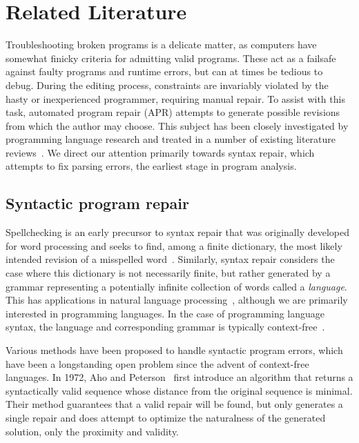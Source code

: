 \chapter{\rm\bfseries Related Literature}
\label{ch:litreview}

Troubleshooting broken programs is a delicate matter, as computers have somewhat finicky criteria for admitting valid programs. These act as a failsafe against faulty programs and runtime errors, but can at times be tedious to debug. During the editing process, constraints are invariably violated by the hasty or inexperienced programmer, requiring manual repair. To assist with this task, automated program repair (APR) attempts to generate possible revisions from which the author may choose. This subject has been closely investigated by programming language research and treated in a number of existing literature reviews~\cite{monperrus2018living, le2021automatic}. We direct our attention primarily towards syntax repair, which attempts to fix parsing errors, the earliest stage in program analysis.

\section{Syntactic program repair}

Spellchecking is an early precursor to syntax repair that was originally developed for word processing and seeks to find, among a finite dictionary, the most likely intended revision of a misspelled word~\cite{kernighan1990spelling}. Similarly, syntax repair considers the case where this dictionary is not necessarily finite, but rather generated by a grammar representing a potentially infinite collection of words called a \textit{language}. This has applications in natural language processing~\cite{bryant2023grammatical}, although we are primarily interested in programming languages. In the case of programming language syntax, the language and corresponding grammar is typically context-free~\cite{chomsky1959algebraic}.

Various methods have been proposed to handle syntactic program errors, which have been a longstanding open problem since the advent of context-free languages. In 1972, Aho and Peterson~\cite{aho1972minimum} first introduce an algorithm that returns a syntactically valid sequence whose distance from the original sequence is minimal. Their method guarantees that a valid repair will be found, but only generates a single repair and does attempt to optimize the naturalness of the generated solution, only the proximity and validity.

